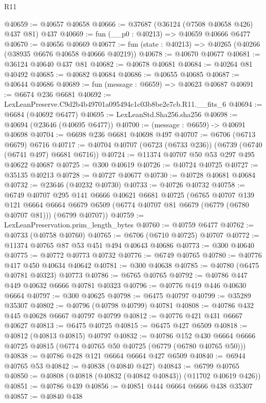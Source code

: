 \begin{lexlean}{R11}
\begin{coremodule}
@40659 := @40657 @40658
@40666 := @37687 (@36124 (@7508 @40658 @426) @437 @81) @437
@40669 := fun (__p0 : @40213) => @40659 @40666 @6477
@40670 := @40656 @40669
@40677 := fun (state : @40213) => @40265 (@40266 (@38935 @6676 @40658 @40666 @40219))
@40678 := @40670 @40677
@40681 := @36124 @40640 @437 @81
@40682 := @40678 @40681
@40684 := @40264 @81 @40492
@40685 := @40682 @40684
@40686 := @40655 @40685
@40687 := @40644 @40686
@40689 := fun (message : @6659) => @40623 @40687
@40691 := @6674 @236 @6681
@40692 := LexLeanPreserve.C9d2b4b49701a095494c1c03b8be2e7cb.R11.__fits_6
@40694 := @6684 (@40692 @6477)
@40695 := LexLeanStd.Sha256.sha256
@40698 := @40694 (@23646 (@40695 @6477))
@40700 := (message : @6659) -> @40691 @40698
@40704 := @6698 @236 @6681 @40698 @497
@40707 := @6706 (@6713 @6679) @6716
@40717 := @40704 @40707 (@6723 (@6733 @236)) (@6739 (@6740 (@6741 @497) @6681 @6716))
@40724 := @11374 @40707 @50 @53 @297 @495 @40622 @40687
@40725 := @300 @40619
@40726 := @40724 @40725
@40727 := @35135 @40213
@40728 := @40727 @40677
@40730 := @40728 @40681 @40684
@40732 := @23646 (@40232 @40730)
@40733 := @40726 @40732
@40758 := @6749
    @40707
    @295
    @141
    @6666
    @40621
    @6681
    @40725
    (@6765
      @40707
      @139
      @121
      @6664
      @6664
      @6679
      @6509
      (@6774 @40707 @81 @6679 (@6779 (@6780 @40707 @81)))
      (@6799 @40707))
@40759 := LexLeanPreservation.prim_length_bytes
@40760 := @40759 @6477
@40762 := @40733 (@40758 @40760)
@40765 := @6706 (@6710 @40725) @40707
@40772 := @11374 @40765 @87 @53 @451 @494 @40643 @40686
@40773 := @300 @40640
@40775 := @40772 @40773 @40732
@40776 := @6749 @40765
@40780 := @40776 @417 @450 @40634 @40642
@40781 := @300 @40638
@40785 := @40780 (@6475 @40781 @40323) @40773
@40786 := @6765 @40765
@40792 := @40786 @447 @449 @40632 @6666 @40781 @40323
@40796 := @40776 @419 @446 @40630 @6664
@40797 := @300 @40625
@40798 := @6475 @40797
@40799 := @35289 @35307
@40802 := @40796 (@40798 @40799) @40781
@40808 := @40786 @432 @445 @40628 @6667 @40797 @40799
@40812 := @40776 @421 @431 @6667 @40627
@40813 := @6475 @40725
@40815 := @6475 @427 @6509
@40818 := @40812 (@40813 @40815) @40797
@40832 := @40786
    @152
    @430
    @6664
    @6666
    @40725
    @40815
    (@6774 @40765 @50 @40725 (@6779 (@6780 @40765 @50)))
@40838 := @40786 @428 @121 @6664 @6664 @427 @6509
@40840 := @6944 @40765 @53
@40842 := @40838 (@40840 @427)
@40843 := @6799 @40765
@40850 := @40808 (@40818 (@40832 (@40842 @40843)) (@11702 @40619 @426))
@40851 := @40786 @439
@40856 := @40851 @444 @6664 @6666 @438 @35307
@40857 := @40840 @438

\end{coremodule}
\end{lexlean}
